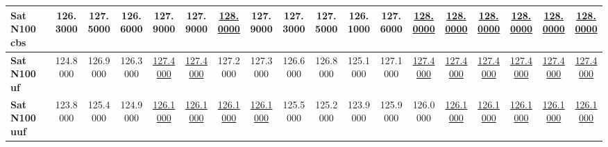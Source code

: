 \begin{table}[ht]
\begin{scriptsize}
\begin{tabular}{l | c c c c c c c c c c c c c c c c c}
\hline
\textbf{Sat N100 cbs}       & 126.3000                    & 127.5000                    & 126.6000                    & 127.9000                    & 127.9000                    & \underline{128.0000}        & 127.9000                    & 127.3000                    & 127.5000                    & 126.1000                    & 127.6000                    & \underline{128.0000}        & \underline{128.0000}        & \underline{128.0000}        & \underline{128.0000}        & \underline{128.0000}        & \underline{128.0000}       \\
\hline
\textbf{Sat N100 uf}        & 124.8000                    & 126.9000                    & 126.3000                    & \underline{127.4000}        & \underline{127.4000}        & 127.2000                    & 127.3000                    & 126.6000                    & 126.8000                    & 125.1000                    & 127.1000                    & \underline{127.4000}        & \underline{127.4000}        & \underline{127.4000}        & \underline{127.4000}        & \underline{127.4000}        & \underline{127.4000}       \\
\hline
\textbf{Sat N100 uuf}       & 123.8000                    & 125.4000                    & 124.9000                    & \underline{126.1000}        & \underline{126.1000}        & \underline{126.1000}        & \underline{126.1000}        & 125.5000                    & 125.2000                    & 123.9000                    & 125.9000                    & 126.0000                    & \underline{126.1000}        & \underline{126.1000}        & \underline{126.1000}        & \underline{126.1000}        & \underline{126.1000}       \\
\hline
\end{tabular}
\end{scriptsize}
\end{table}